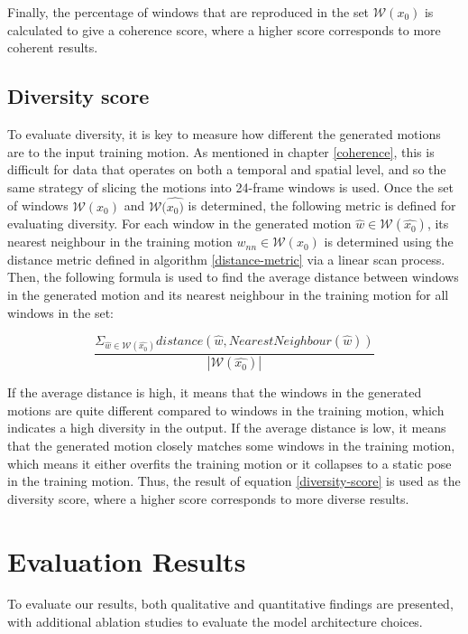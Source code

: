 \documentclass[a4paper, 12pt]{report}
\begin{document}
Finally, the percentage of windows that are reproduced in the set \(\mathcal{W}(x_0)\) is calculated to give a coherence score, where a higher score corresponds to more coherent results.

\subsection{Diversity score}
To evaluate diversity, it is key to measure how different the generated motions are to the input training motion. As mentioned in chapter \ref{coherence}, this is difficult for data that operates on both a temporal and spatial level, and so the same strategy of slicing the motions into 24-frame windows is used. Once  the set of windows \(\mathcal{W}(x_0)\) and \(\mathcal{W}(\hat{x_0)}\) is determined, the following metric is defined for evaluating diversity. For each window in the generated motion \(\hat{w} \in \mathcal{W}(\hat{x_0})\), its nearest neighbour in the training motion \(w_{nn} \in \mathcal{W}(x_0)\) is determined using the distance metric defined in algorithm \ref{distance-metric} via a linear scan process. Then, the following formula is used to find the average distance between windows in the generated motion and its nearest neighbour in the training motion for all windows in the set:

\begin{equation} \label{diversity-score}
	\dfrac{\Sigma_{\hat{w} \in \mathcal{W}(\hat{x_0})} distance(\hat{w}, NearestNeighbour(\hat{w}))}{|\mathcal{W}(\hat{x_0})|}
\end{equation}

If the average distance is high, it means that the windows in the generated motions are quite different compared to windows in the training motion, which indicates a high diversity in the output. If the average distance is low, it means that the generated motion closely matches some windows in the training motion, which means it either overfits the training motion or it collapses to a static pose in the training motion. Thus, the result of equation \ref{diversity-score} is used as the diversity score, where a higher score corresponds to more diverse results.

\section{Evaluation Results}
To evaluate our results, both qualitative and quantitative findings are presented, with additional ablation studies to evaluate the model architecture choices.
\end{document}
